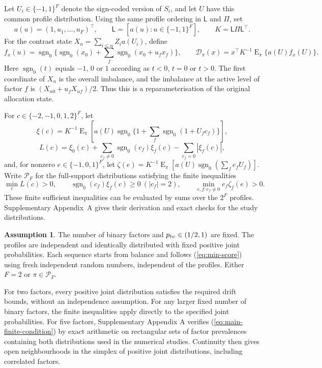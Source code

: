 \documentclass[12pt,a4paper]{article}
\theoremstyle{definition}
\newtheorem{assumption}{Assumption}
\newcommand{\E}{\operatorname E}
\newcommand{\sg}{\operatorname{sgn}_0}
\begin{document}
Let $U_i\in\{-1,1\}^F$ denote the sign-coded version of $S_i$, and let $U$ have this common profile distribution. Using the same profile ordering in $\mathsf L$ and $\Pi$, set
\[
 a(u)=(1,u_1,\ldots,u_F)^\top,\qquad
 \mathsf L=[a(u):u\in\{-1,1\}^F],\qquad K=\mathsf L\Pi \mathsf L^\top.
\]
For the contrast state $X_n=\sum_{i\le n}Z_i a(U_i)$, define
\begin{equation}\label{eq:alloc-H}
 f_x(u)=\sg\{\sg(x_0)+\sum_f\sg(x_0+u_fx_f)\},\qquad
 \mathcal D_\pi(x)=x^\top K^{-1}\E_\pi\{a(U)f_x(U)\}.
\end{equation}
Here $\sg(t)$ equals $-1$, $0$ or $1$ according as $t<0$, $t=0$ or $t>0$. The first coordinate of $X_n$ is the overall imbalance, and the imbalance at the active level of factor $f$ is $(X_{n0}+u_fX_{nf})/2$. Thus this is a reparameterisation of the original allocation state.

For $c\in\{-2,-1,0,1,2\}^F$, let
\[
 \xi(c)=K^{-1}\E_\pi\left[a(U)\sg\{1+\sum_f\sg(1+U_fc_f)\}\right],
\]
\[
 L(c)=\xi_0(c)+\sum_{c_f\ne0}\sg(c_f)\xi_f(c)-\sum_{c_f=0}|\xi_f(c)|,
\]
and, for nonzero $e\in\{-1,0,1\}^F$, let $\zeta(e)=K^{-1}\E_\pi[a(U)\sg(\sum_fe_fU_f)]$. Write $\mathcal P_F$ for the full-support distributions satisfying the finite inequalities
\begin{equation}\label{eq:main-finite-condition}
 \min_c L(c)>0,\qquad
 \sg(c_f)\xi_f(c)\ge0\ (|c_f|=2),\qquad
 \min_{e,f:e_f\ne0}e_f\zeta_f(e)>0.
\end{equation}
These finite sufficient inequalities can be evaluated by sums over the $2^F$ profiles. Supplementary Appendix~A gives their derivation and exact checks for the study distributions.

\begin{assumption}\label{ass:main-minimization}
The number of binary factors and $p_{\rm bc}\in(1/2,1)$ are fixed. The profiles are independent and identically distributed with fixed positive joint probabilities. Each sequence starts from balance and follows (\ref{eq:min-score}) using fresh independent random numbers, independent of the profiles. Either $F=2$ or $\pi\in\mathcal P_F$.
\end{assumption}
For two factors, every positive joint distribution satisfies the required drift bounds, without an independence assumption. For any larger fixed number of binary factors, the finite inequalities apply directly to the specified joint probabilities. For five factors, Supplementary Appendix A verifies (\ref{eq:main-finite-condition}) by exact arithmetic on rectangular sets of factor prevalences containing both distributions used in the numerical studies. Continuity then gives open neighbourhoods in the simplex of positive joint distributions, including correlated factors.
\end{document}
